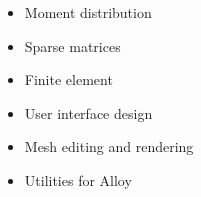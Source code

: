 \documentclass[../../proposal.tex]{subfiles}
\begin{document}
\begin{itemize}
    \item Moment distribution
    \item Sparse matrices
    \item Finite element
    \item User interface design
    \item Mesh editing and rendering
    \item Utilities for Alloy
\end{itemize}
\end{document}
